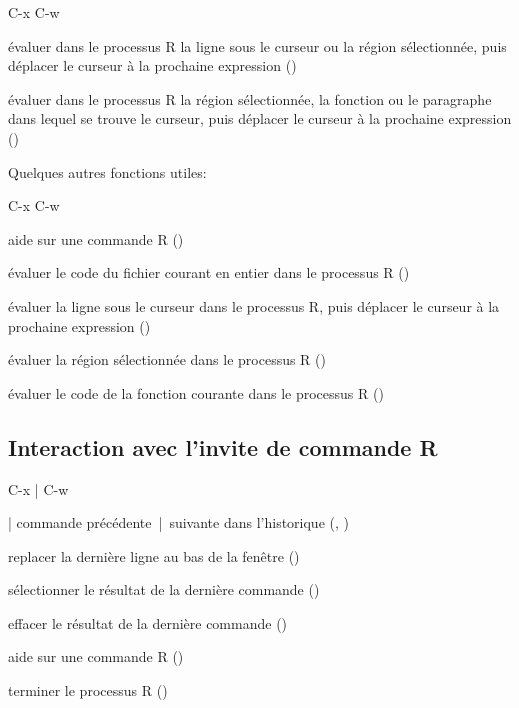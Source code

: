 \begin{ttscript}{C-x C-w}
  \raggedright
\item[\ess{C-RET}] évaluer dans le processus R la ligne sous le
  curseur ou la région sélectionnée, puis déplacer le curseur à la
  prochaine expression ()
\item[\ess{C-c C-c}] évaluer dans le processus R la région sélectionnée, la
  fonction ou le paragraphe dans lequel se trouve le curseur, puis
  déplacer le curseur à la prochaine expression
  ()
\end{ttscript}
Quelques autres fonctions utiles:
\begin{ttscript}{C-x C-w}
  \raggedright
\item[\ess{C-c C-v}] aide sur une commande R
  ()
\item[\ess{C-c C-l}] évaluer le code du fichier courant en entier dans
  le processus R ()
\item[\ess{C-c C-n}] évaluer la ligne sous le curseur dans le
  processus R, puis déplacer le curseur à la prochaine expression
  ()
\item[\ess{C-c C-r}] évaluer la région sélectionnée dans le processus
  R ()
\item[\ess{C-c C-f}] évaluer le code de la fonction courante dans
  le processus R ()
\end{ttscript}

\subsection{Interaction avec l'invite de commande R}
\label{emacs+ess:commandes:invite}

\begin{ttscript}{C-x | C-w}
  \raggedright
\item[\ess{M-p} | \ess{M-n}] commande précédente~|~suivante
  dans l'historique (,
  )
\item[\ess{C-c C-e}] replacer la dernière ligne au bas de la fenêtre
  ()
\item[\ess{M-h}] sélectionner le résultat de la dernière commande
  ()
\item[\ess{C-c C-o}] effacer le résultat de la dernière commande
  ()
\item[\ess{C-c C-v}] aide sur une commande R
  ()
\item[\ess{C-c C-q}] terminer le processus R ()
\end{ttscript}

